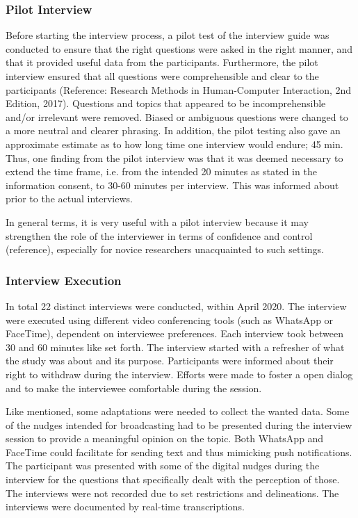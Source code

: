         \subsubsection{Pilot Interview}
        Before starting the interview process, a pilot test of the interview guide was conducted to ensure that the right questions were asked in the right manner, and that it provided useful data from the participants.  Furthermore, the pilot interview ensured that all questions were comprehensible and clear to  the  participants (Reference:  Research Methods in Human-Computer Interaction, 2nd Edition, 2017).  Questions and topics that appeared to be incomprehensible and/or irrelevant were removed. Biased or ambiguous questions were changed to a more neutral and clearer phrasing. In addition, the pilot testing also gave an approximate estimate as to how long time one interview would endure; 45 min. Thus, one finding from the pilot interview was that it was deemed necessary to extend the time frame, i.e. from the intended 20 minutes as stated in the information consent, to 30-60 minutes per interview. This was informed about prior to the actual interviews.
        
        In general terms, it is very useful with a pilot interview because it may strengthen the role of the interviewer in terms of confidence and control (reference), especially for novice researchers unacquainted to such settings. 
        
        \subsubsection{Interview Execution}
        In total 22 distinct interviews were conducted, within April 2020. The interview were executed using different video conferencing tools (such as WhatsApp or FaceTime), dependent on interviewee preferences. Each interview took between 30 and 60 minutes like set forth. The interview started with a refresher of what the study was about and its purpose. Participants were informed about their right to withdraw during the interview. Efforts were made to foster a open dialog and to make the interviewee comfortable during the session. 
 
        Like mentioned, some adaptations were needed to collect the wanted data. Some of the nudges intended for broadcasting had to be presented during the interview session to provide a meaningful opinion on the topic. Both WhatsApp and FaceTime could facilitate for sending text and thus mimicking push notifications. The participant was presented with some of the digital nudges during the interview for the questions that specifically dealt with the perception of those.
        The interviews were not recorded due to set restrictions and delineations. The interviews were documented by real-time transcriptions. 

